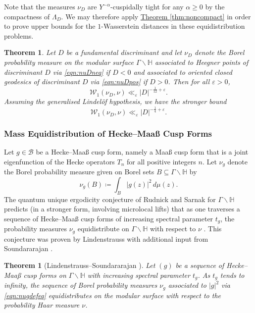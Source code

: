 \documentclass[11pt,a4paper]{amsart}
\newcommand{\BB}{\mathcal{B}}
\newcommand{\e}{\varepsilon}
\newcommand{\Hb}{\mathbb{H}}
\newcommand{\Wscr}{\mathscr{W}}
\numberwithin{equation}{section}
\newtheorem{theorem}[equation]{Theorem}
\theoremstyle{remark}
\theoremstyle{definition}
\begin{document}
Note that the measures $\nu_D$ are $Y^{-\alpha}$-cuspidally tight for any $\alpha \geq 0$ by the compactness of $\Lambda_D$. We may therefore apply \hyperref[thm:noncompact]{Theorem \ref*{thm:noncompact}} in order to prove upper bounds for the $1$-Wasserstein distances in these equidistribution problems.

\begin{theorem}
\label{thm:Duke}
Let $D$ be a fundamental discriminant and let $\nu_D$ denote the Borel probability measure on the modular surface $\Gamma \backslash \Hb$ associated to Heegner points of discriminant $D$ via \eqref{eqn:nuDneq} if $D < 0$ and associated to oriented closed geodesics of discriminant $D$ via \eqref{eqn:nuDpos} if $D > 0$. Then for all $\e > 0$,
\begin{equation}
\label{eqn:W1Duke}
\Wscr_1(\nu_D,\nu) \ll_{\e} |D|^{-\frac{1}{12} + \e}.
\end{equation}
Assuming the generalised Lindel\"{o}f hypothesis, we have the stronger bound
\begin{equation}
\label{eqn:W1DukeGLH}
\Wscr_1(\nu_D,\nu) \ll_{\e} |D|^{-\frac{1}{4} + \e}.
\end{equation}
\end{theorem}


\subsubsection{Mass Equidistribution of Hecke--Maa\ss{} Cusp Forms}

Let $g \in \BB$ be a Hecke--Maa\ss{} cusp form, namely a Maa\ss{} cusp form that is a joint eigenfunction of the Hecke operators $T_n$ for all positive integers $n$. Let $\nu_g$ denote the Borel probability measure given on Borel sets $B \subseteq \Gamma \backslash \Hb$ by
\begin{equation}
\label{eqn:nugdefeq}
\nu_g(B) \coloneqq \int_{B} |g(z)|^2 \, d\mu(z).
\end{equation}
The quantum unique ergodicity conjecture of Rudnick and Sarnak for $\Gamma \backslash \Hb$ predicts (in a stronger form, involving microlocal lifts) that as one traverses a sequence of Hecke--Maa\ss{} cusp forms of increasing spectral parameter $t_g$, the probability measures $\nu_g$ equidistribute on $\Gamma \backslash \Hb$ with respect to $\nu$ \cite[Conjecture]{RS94}. This conjecture was proven by Lindenstrauss \cite[Theorem 1.4]{Lin06} with additional input from Soundararajan \cite{Sou10b}.

\begin{theorem}[Lindenstrauss--Soundararajan {\cite{Lin06,Sou10b}}]
\label{thm:ineffectiveMaassQUE}
Let $(g)$ be a sequence of Hecke--Maa\ss{} cusp forms on $\Gamma \backslash \Hb$ with increasing spectral parameter $t_g$. As $t_g$ tends to infinity, the sequence of Borel probability measures $\nu_g$ associated to $|g|^2$ via \eqref{eqn:nugdefeq} equidistributes on the modular surface with respect to the probability Haar measure $\nu$.
\end{theorem}
\end{document}
